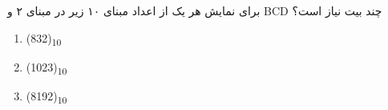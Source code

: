 
برای نمایش هر یک از اعداد مبنای ۱۰ زیر در مبنای ۲ و BCD چند بیت نیاز است؟

\begin{latin}
	\begin{enumerate}
			\item 
			(832)\textsubscript{10}
			
			\item 
			(1023)\textsubscript{10}
			
			\item 
			(8192)\textsubscript{10}
		\end{enumerate}
\end{latin}
